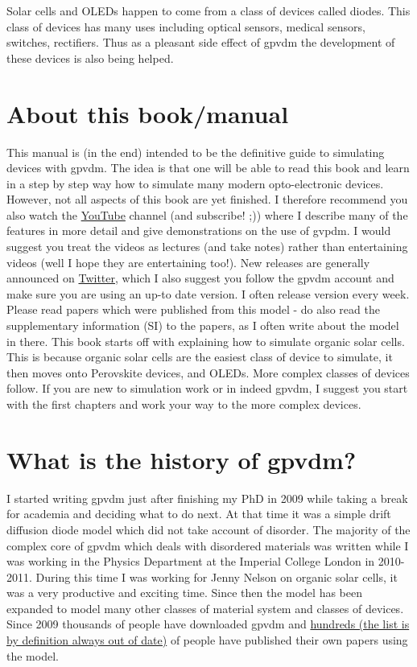 Solar cells and OLEDs happen to come from a class of devices called diodes. This class of devices has many uses including optical sensors, medical sensors, switches, rectifiers. Thus as a pleasant side effect of gpvdm the development of these devices is also being helped.

\section{About this book/manual}
This manual is (in the end) intended to be the definitive guide to simulating devices with gpvdm. The idea is that one will be able to read this book and learn in a step by step way how to simulate many modern opto-electronic devices.  However, not all aspects of this book are yet finished. I therefore recommend you also watch the \href{https://www.youtube.com/channel/UCbm_0AKX1SpbMMT7jilxFfA}{YouTube} channel (and subscribe! ;)) where I describe many of the features in more detail and give demonstrations on the use of gvpdm. I would suggest you treat the videos as lectures (and take notes) rather than entertaining videos (well I hope they are entertaining too!). New releases are generally announced on \href{https://twitter.com/gpvdm_info}{Twitter}, which I also suggest you follow the gpvdm account and make sure you are using an up-to date version. I often release version every week.  Please read papers which were published from this model - do also read the supplementary information (SI) to the papers, as I often write about the model in there.
This book starts off with explaining how to simulate organic solar cells. This is because organic solar cells are the easiest class of device to simulate, it then moves onto Perovskite devices, and OLEDs. More complex classes of devices follow.  If you are new to simulation work or in indeed gpvdm, I suggest you start with the first chapters and work your way to the more complex devices.

\section{What is the history of gpvdm?}
I started writing gpvdm just after finishing my PhD in 2009 while taking a break for academia and deciding what to do next. At that time it was a simple drift diffusion diode model which did not take account of disorder. The majority of the complex core of gpvdm which deals with disordered materials was written while I was working in the Physics Department at the Imperial College London in 2010-2011. During this time I was working for Jenny Nelson on organic solar cells, it was a very productive and exciting time. Since then the model has been expanded to model many other classes of material system and classes of devices. Since 2009 thousands of people have downloaded gpvdm and \href{http://www.gpvdm.com/publications.html}{hundreds (the list is by definition always out of date)} of people have published their own papers using the model.

